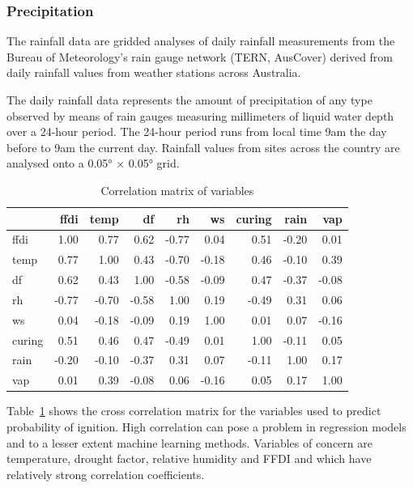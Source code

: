 \documentclass[11pt,a4paper]{article}
\begin{document}
\subsubsection{Precipitation}

The rainfall data are gridded analyses of daily rainfall measurements from the Bureau of Meteorology's rain gauge network (TERN, AusCover) derived from daily rainfall values from weather stations across Australia.

The daily rainfall data represents the amount of precipitation of any type observed by means of rain gauges measuring millimeters of liquid water depth over a 24-hour period. The 24-hour period runs from local time 9am the day before to 9am the current day. Rainfall values from sites across the country are analysed onto a 0.05° × 0.05° grid.

\begin{table}
  \centering
  \begin{tabular}{lrrrrrrrr}
    \toprule
           & ffdi  & temp  & df    & rh    & ws    & curing & rain  & vap \\
    \midrule
    ffdi   & 1.00  & 0.77  & 0.62  & -0.77 & 0.04  & 0.51   & -0.20 & 0.01 \\
    temp   & 0.77  & 1.00  & 0.43  & -0.70 & -0.18 & 0.46   & -0.10 & 0.39 \\
    df     & 0.62  & 0.43  & 1.00  & -0.58 & -0.09 & 0.47   & -0.37 & -0.08 \\
    rh     & -0.77 & -0.70 & -0.58 & 1.00  & 0.19  & -0.49  & 0.31  & 0.06 \\
    ws     & 0.04  & -0.18 & -0.09 & 0.19  & 1.00  & 0.01   & 0.07  & -0.16 \\
    curing & 0.51  & 0.46  & 0.47  & -0.49 & 0.01  & 1.00   & -0.11 & 0.05 \\
    rain   & -0.20 & -0.10 & -0.37 & 0.31  & 0.07  & -0.11  & 1.00  & 0.17 \\
    vap    & 0.01  & 0.39  & -0.08 & 0.06  & -0.16 & 0.05   & 0.17  & 1.00 \\
    \bottomrule
  \end{tabular}
  \caption{Correlation matrix of variables}
  \label{table:correl}
\end{table}

Table~\ref{table:correl} shows the cross correlation matrix for the variables used to predict probability of ignition. High correlation can pose a problem in regression models and to a lesser extent machine learning methods. Variables of concern are temperature, drought factor, relative humidity and FFDI and  which have relatively strong correlation coefficients.
\end{document}
